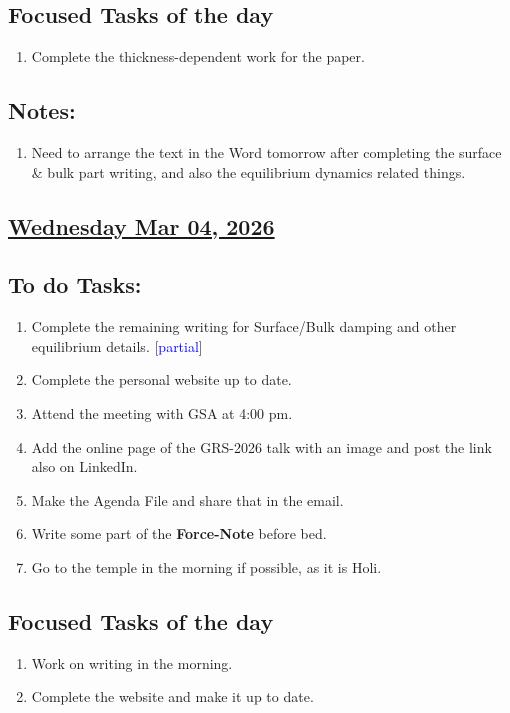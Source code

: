 \subsection*{Focused Tasks of the day}
\begin{enumerate}[\ding{212}]  
    \item Complete the thickness-dependent work for the paper.
\end{enumerate}
\subsection*{Notes:}
\begin{enumerate}
    \item Need to arrange the text in the Word tomorrow after completing the surface \& bulk part writing, and also the equilibrium dynamics related things.
\end{enumerate}
\subsection*{\underline{Wednesday Mar 04, 2026} }
\subsection*{To do Tasks:}
\begin{enumerate}
    \item Complete the remaining writing for Surface/Bulk damping and other equilibrium details. [\textcolor{blue}{partial}]
    \item Complete the personal website up to date. \cmark
    \item Attend the meeting with GSA at 4:00 pm. \cmark
    \item Add the online page of the GRS-2026 talk with an image and post the link also on LinkedIn.
    \item Make the Agenda File and share that in the email.
    \item Write some part of the \textbf{Force-Note} before bed.
    \item Go to the temple in the morning if possible, as it is Holi. \xmark
\end{enumerate}
\subsection*{Focused Tasks of the day}
\begin{enumerate}[\ding{212}]  
    \item Work on writing in the morning.
    \item Complete the website and make it up to date. \cmark
\end{enumerate}
